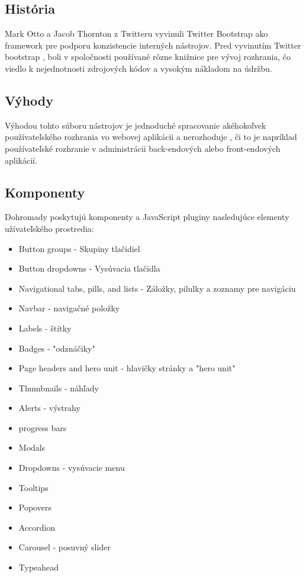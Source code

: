 \subsection{História}
Mark Otto a Jacob Thornton z Twitteru vyvinuli Twitter Bootstrap ako framework pre podporu konzistencie interných nástrojov. Pred vyvinutím Twitter bootstrap , boli v spoločnosti používané rôzne knižnice pre vývoj rozhrania, čo viedlo k nejednotnosti zdrojových kódov a vysokým nákladom na údržbu.


\subsection{Výhody}
Výhodou tohto súboru nástrojov je jednoduché spracovanie akéhokoľvek používateľského rozhrania vo webovej aplikácii a nerozhoduje , či to je napríklad používateľské rozhranie v administrácii back-endových alebo front-endových aplikácií.

\subsection{Komponenty}
Dohromady poskytujú komponenty a JavaScript pluginy nasledujúce elementy užívateľského prostredia:
\begin{itemize}
\item Button groups - Skupiny tlačidiel
\item Button dropdowns - Vysúvacia tlačidla
\item Navigational tabs, pills, and lists - Záložky, pilulky a zoznamy pre navigáciu
\item Navbar - navigačné položky
\item Labels - štítky
\item Badges - "odznáčiky"
\item Page headers and hero unit - hlavičky stránky a "hero unit"
\item Thumbnails - náhľady
\item Alerts - výstrahy
\item progress bars
\item Modals
\item Dropdowns - vysúvacie menu
\item Tooltips
\item Popovers
\item Accordion
\item Carousel - posuvný slider
\item Typeahead
\end{itemize}

